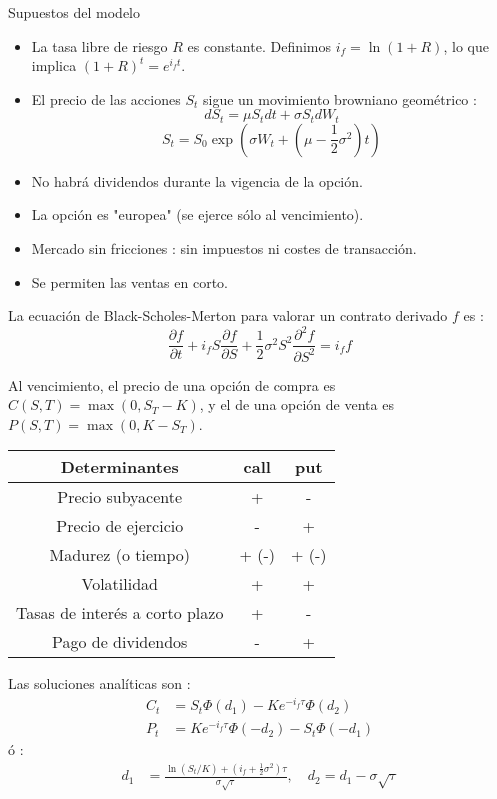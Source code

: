 \begin{f}
Supuestos del modelo 
\begin{itemize}
	\item La tasa libre de riesgo \(R\) es constante. Definimos \(i_f = \ln(1+R)\), lo que implica \((1+R)^t = e^{i_f t}\).
	\item El precio de las acciones \(S_t\) sigue un movimiento browniano geométrico :
	\[
	dS_t = \mu S_t dt + \sigma S_t dW_t 
	\]
	\[
	 S_t = S_0 \exp\left(\sigma W_t + \left( \mu - \frac{1}{2}\sigma^2 \right)t \right)
	\]
	\item No habrá dividendos durante la vigencia de la opción.
	\item La opción es "europea" (se ejerce sólo al vencimiento).
	\item Mercado sin fricciones : sin impuestos ni costes de transacción.
	\item Se permiten las ventas en corto.
\end{itemize}

La ecuación de Black-Scholes-Merton para valorar un contrato derivado \(f\) es :
\[
\frac{\partial f}{\partial t} + i_f S \frac{\partial f}{\partial S} + \frac{1}{2}\sigma^2 S^2 \frac{\partial^2 f}{\partial S^2} = i_f f
\]

Al vencimiento, el precio de una opción de compra es \(C(S,T) = \max(0, S_T - K)\), y el de una opción de venta es \(P(S,T) = \max(0, K - S_T)\).


\begin{center}
	\begin{tabular}{|c|c|c|}
		\hline
		Determinantes & \textbf{call}&\textbf{put}\\
		\hline
		Precio subyacente	      & +&	-\\
		Precio de ejercicio	              & -&	+\\
		Madurez (o tiempo)    & + (-)&	+ (-)\\
		Volatilidad	              & +&	+\\
		Tasas de interés a corto plazo  & +&	-\\
		Pago de dividendos	      & -&	+\\
		\hline
	\end{tabular}
\end{center}

Las soluciones analíticas son :
\begin{align*}
	C_t &= S_t \Phi(d_1) - Ke^{-i_f \tau} \Phi(d_2) \\
	P_t &= Ke^{-i_f \tau} \Phi(-d_2) - S_t \Phi(-d_1)
\end{align*}
ó :
\begin{align*}
	d_1 &= \frac{\ln(S_t/K) + (i_f + \frac{1}{2}\sigma^2)\tau}{\sigma \sqrt{\tau}}, \quad
	d_2 = d_1 - \sigma \sqrt{\tau}
\end{align*}


\end{f}
